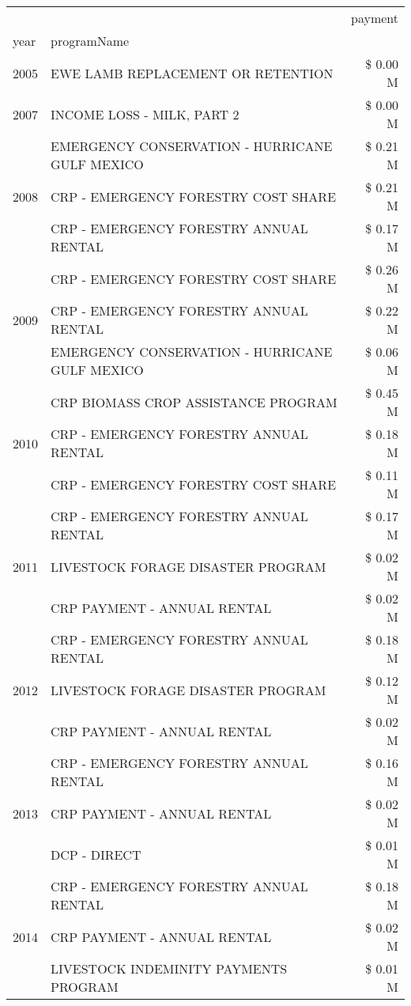 \begin{tabular}{llr}
\toprule
 &  & payment \\
year & programName &  \\
\midrule
2005 & EWE LAMB REPLACEMENT OR RETENTION & \$ 0.00 M \\
\cline{1-3}
2007 & INCOME LOSS - MILK, PART 2 & \$ 0.00 M \\
\cline{1-3}
\multirow[t]{3}{*}{2008} & EMERGENCY CONSERVATION - HURRICANE GULF MEXICO & \$ 0.21 M \\
 & CRP - EMERGENCY FORESTRY COST SHARE & \$ 0.21 M \\
 & CRP - EMERGENCY FORESTRY ANNUAL RENTAL & \$ 0.17 M \\
\cline{1-3}
\multirow[t]{3}{*}{2009} & CRP - EMERGENCY FORESTRY COST SHARE & \$ 0.26 M \\
 & CRP - EMERGENCY FORESTRY ANNUAL RENTAL & \$ 0.22 M \\
 & EMERGENCY CONSERVATION - HURRICANE GULF MEXICO & \$ 0.06 M \\
\cline{1-3}
\multirow[t]{3}{*}{2010} & CRP BIOMASS CROP ASSISTANCE PROGRAM & \$ 0.45 M \\
 & CRP - EMERGENCY FORESTRY ANNUAL RENTAL & \$ 0.18 M \\
 & CRP - EMERGENCY FORESTRY COST SHARE & \$ 0.11 M \\
\cline{1-3}
\multirow[t]{3}{*}{2011} & CRP - EMERGENCY FORESTRY ANNUAL RENTAL & \$ 0.17 M \\
 & LIVESTOCK FORAGE DISASTER PROGRAM & \$ 0.02 M \\
 & CRP PAYMENT - ANNUAL RENTAL & \$ 0.02 M \\
\cline{1-3}
\multirow[t]{3}{*}{2012} & CRP - EMERGENCY FORESTRY ANNUAL RENTAL & \$ 0.18 M \\
 & LIVESTOCK FORAGE DISASTER PROGRAM & \$ 0.12 M \\
 & CRP PAYMENT - ANNUAL RENTAL & \$ 0.02 M \\
\cline{1-3}
\multirow[t]{3}{*}{2013} & CRP - EMERGENCY FORESTRY ANNUAL RENTAL & \$ 0.16 M \\
 & CRP PAYMENT - ANNUAL RENTAL & \$ 0.02 M \\
 & DCP - DIRECT & \$ 0.01 M \\
\cline{1-3}
\multirow[t]{3}{*}{2014} & CRP - EMERGENCY FORESTRY ANNUAL RENTAL & \$ 0.18 M \\
 & CRP PAYMENT - ANNUAL RENTAL & \$ 0.02 M \\
 & LIVESTOCK INDEMINITY PAYMENTS PROGRAM & \$ 0.01 M \\

\end{tabular}
